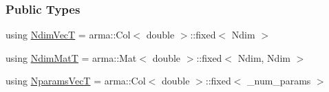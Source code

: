 \subsubsection*{Public Types}
\begin{DoxyCompactItemize}
\item 
using \hyperlink{classprior__hessian_1_1MultivariateNormalDist_a0f5725cbbfa47be45b2741467dcd5615}{Ndim\+VecT} = arma\+::\+Col$<$ double $>$\+::fixed$<$ Ndim $>$
\item 
using \hyperlink{classprior__hessian_1_1MultivariateNormalDist_a2aa1e12ff8819a2cc3a8d3f33bcf8de2}{Ndim\+MatT} = arma\+::\+Mat$<$ double $>$\+::fixed$<$ Ndim, Ndim $>$
\item 
using \hyperlink{classprior__hessian_1_1MultivariateNormalDist_ac690a8a9b00e4e0e159a15bb9c212852}{Nparams\+VecT} = arma\+::\+Col$<$ double $>$\+::fixed$<$ \+\_\+num\+\_\+params $>$
\end{DoxyCompactItemize}
